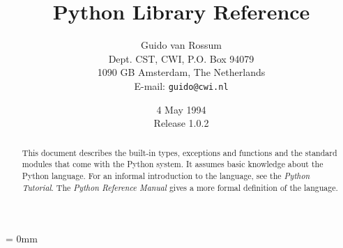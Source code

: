 
\title{Python Library Reference}

\author{
	Guido van Rossum \\
	Dept. CST, CWI, P.O. Box 94079 \\
	1090 GB Amsterdam, The Netherlands \\
	E-mail: {\tt guido@cwi.nl}
}

\date{4 May 1994 \\ Release 1.0.2} %

\makeindex			%





\maketitle

\begin{abstract}

\noindent
This document describes the built-in types, exceptions and functions
and the standard modules that come with the Python system.  It assumes
basic knowledge about the Python language.  For an informal
introduction to the language, see the {\em Python Tutorial}.  The {\em
Python Reference Manual} gives a more formal definition of the
language.

\end{abstract}

\pagebreak

{
\parskip = 0mm
\tableofcontents
}

\pagebreak

































